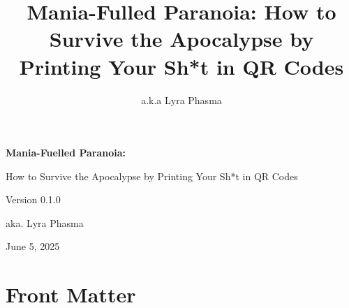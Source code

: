 \documentclass[12pt]{codex} %
\title{Mania-Fulled Paranoia: How to Survive the Apocalypse by Printing Your Sh*t in QR Codes}     %
\author{a.k.a Lyra Phasma}                           %
\begin{document}



\begin{romanpages}                     %

\begin{titlepage}
  \centering
  \vspace*{\fill}
  {\HUGETITLE\bfseries Mania-Fuelled Paranoia: \par}
  \vspace{0.25em}
  {\HUGE How to Survive the Apocalypse by Printing Your Sh*t in QR Codes \par}
  \vspace{1.5em}
  {\Large Version 0.1.0\par}
  \vspace{2em}
  {\Large aka. Lyra Phasma\par}
  \vspace{1em}
  {\Large June 5, 2025\par}
  \vspace*{\fill}
\end{titlepage}

\part{Front Matter}

\tableofcontents                      %
\listoffigures                        %
\listoftables                         %
\end{romanpages}                      %
\end{document}
